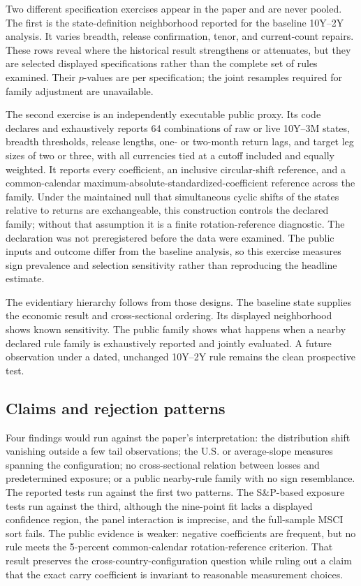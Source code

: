 Two different specification exercises appear in the paper and are never pooled. The first is the state-definition neighborhood reported for the baseline 10Y--2Y analysis. It varies breadth, release confirmation, tenor, and current-count repairs. These rows reveal where the historical result strengthens or attenuates, but they are selected displayed specifications rather than the complete set of rules examined. Their $p$-values are per specification; the joint resamples required for family adjustment are unavailable.

The second exercise is an independently executable public proxy. Its code declares and exhaustively reports 64 combinations of raw or live 10Y--3M states, breadth thresholds, release lengths, one- or two-month return lags, and target leg sizes of two or three, with all currencies tied at a cutoff included and equally weighted. It reports every coefficient, an inclusive circular-shift reference, and a common-calendar maximum-absolute-standardized-coefficient reference across the family. Under the maintained null that simultaneous cyclic shifts of the states relative to returns are exchangeable, this construction controls the declared family; without that assumption it is a finite rotation-reference diagnostic. The declaration was not preregistered before the data were examined. The public inputs and outcome differ from the baseline analysis, so this exercise measures sign prevalence and selection sensitivity rather than reproducing the headline estimate.

The evidentiary hierarchy follows from those designs. The baseline state supplies the economic result and cross-sectional ordering. Its displayed neighborhood shows known sensitivity. The public family shows what happens when a nearby declared rule family is exhaustively reported and jointly evaluated. A future observation under a dated, unchanged 10Y--2Y rule remains the clean prospective test.

\subsection{Claims and rejection patterns}

Four findings would run against the paper's interpretation: the distribution shift vanishing outside a few tail observations; the U.S. or average-slope measures spanning the configuration; no cross-sectional relation between losses and predetermined exposure; or a public nearby-rule family with no sign resemblance. The reported tests run against the first two patterns. The S\&P-based exposure tests run against the third, although the nine-point fit lacks a displayed confidence region, the panel interaction is imprecise, and the full-sample MSCI sort fails. The public evidence is weaker: negative coefficients are frequent, but no rule meets the 5-percent common-calendar rotation-reference criterion. That result preserves the cross-country-configuration question while ruling out a claim that the exact carry coefficient is invariant to reasonable measurement choices.
